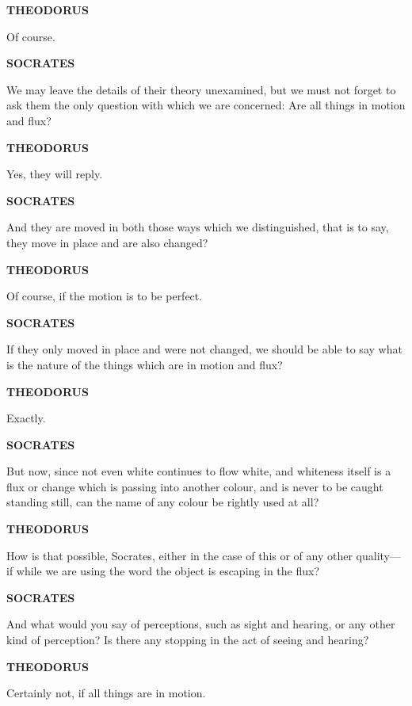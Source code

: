 \documentclass[11pt,letter]{article}
\begin{document}
\par \textbf{THEODORUS}
\par   Of course.

\par \textbf{SOCRATES}
\par   We may leave the details of their theory unexamined, but we must not forget to ask them the only question with which we are concerned:  Are all things in motion and flux?

\par \textbf{THEODORUS}
\par   Yes, they will reply.

\par \textbf{SOCRATES}
\par   And they are moved in both those ways which we distinguished, that is to say, they move in place and are also changed?

\par \textbf{THEODORUS}
\par   Of course, if the motion is to be perfect.

\par \textbf{SOCRATES}
\par   If they only moved in place and were not changed, we should be able to say what is the nature of the things which are in motion and flux?

\par \textbf{THEODORUS}
\par   Exactly.

\par \textbf{SOCRATES}
\par   But now, since not even white continues to flow white, and whiteness itself is a flux or change which is passing into another colour, and is never to be caught standing still, can the name of any colour be rightly used at all?

\par \textbf{THEODORUS}
\par   How is that possible, Socrates, either in the case of this or of any other quality—if while we are using the word the object is escaping in the flux?

\par \textbf{SOCRATES}
\par   And what would you say of perceptions, such as sight and hearing, or any other kind of perception? Is there any stopping in the act of seeing and hearing?

\par \textbf{THEODORUS}
\par   Certainly not, if all things are in motion.
\end{document}
